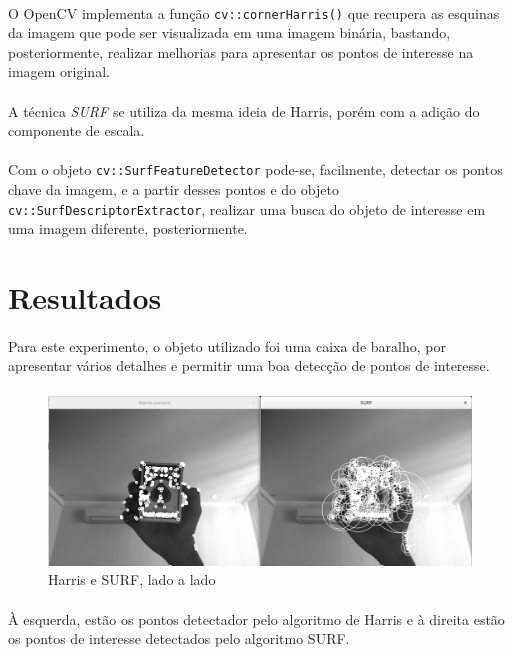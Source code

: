 \documentclass[conference, harvard, brazil, english]{sbatex}
\begin{document}
			\paragraph{}
			O OpenCV implementa a função \verb|cv::cornerHarris()| que recupera as esquinas da imagem que pode ser visualizada em uma imagem binária, bastando, posteriormente, realizar melhorias para apresentar os pontos de interesse na imagem original.
			\paragraph{}
			A técnica \textit{SURF} se utiliza da mesma ideia de Harris, porém com a adição do componente de escala.
			\paragraph{}
			Com o objeto \verb|cv::SurfFeatureDetector| pode-se, facilmente, detectar os pontos chave da imagem, e a partir desses pontos e do objeto \verb|cv::SurfDescriptorExtractor|, realizar uma busca do objeto de interesse em uma imagem diferente, posteriormente.
		\section{Resultados}
			\paragraph{}
			Para este experimento, o objeto utilizado foi uma caixa de baralho, por apresentar vários detalhes e permitir uma boa detecção de pontos de interesse.
			\paragraph{}
			\begin{figure}[h]
				\includegraphics[scale=0.16]{harris-surf}
				\caption{Harris e SURF, lado a lado}
			\end{figure}
			\paragraph{}
			À esquerda, estão os pontos detectador pelo algoritmo de Harris e à direita estão os pontos de interesse detectados pelo algoritmo SURF. 
\end{document}
